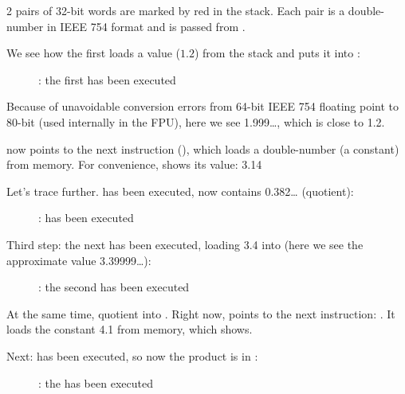 ﻿\clearpage
{}
\myindex{\olly}

2 pairs of 32-bit words are marked by red in the stack. 
Each pair is a double-number in IEEE 754 format and is passed from \main.

We see how the first \FLD loads a value ($1.2$) from the stack and puts it into :

\begin{figure}[H]
\centering
{}
\caption{\olly: the first \FLD has been executed}
\label{fig:FPU_simple_olly_1}
\end{figure}

Because of unavoidable conversion errors from 64-bit IEEE 754 floating point to 80-bit
(used internally in the FPU), here we see 1.999\ldots, which is close to 1.2.

\EIP now points to the next instruction (\FDIV), which loads a double-number (a constant) from memory.
For convenience, \olly shows its value: 3.14

\clearpage
Let's trace further. 
\FDIV has been executed, now  contains 0.382\ldots
(\gls{quotient}):

\begin{figure}[H]
\centering
{}
\caption{\olly: \FDIV has been executed}
\label{fig:FPU_simple_olly_2}
\end{figure}

\clearpage
Third step: the next \FLD 
has been executed, loading 3.4 into  (here we see the approximate value 3.39999\ldots): 

\begin{figure}[H]
\centering
{}
\caption{\olly: the second \FLD has been executed}
\label{fig:FPU_simple_olly_3}
\end{figure}

At the same time, \gls{quotient}  into .
Right now, \EIP points to the next instruction: \FMUL. 
It loads the constant 4.1 from memory, which \olly shows.

\clearpage
Next: \FMUL has been executed, so now the \gls{product} is in :

\begin{figure}[H]
\centering
{}
\caption{\olly: the \FMUL has been executed}
\label{fig:FPU_simple_olly_4}
\end{figure}

